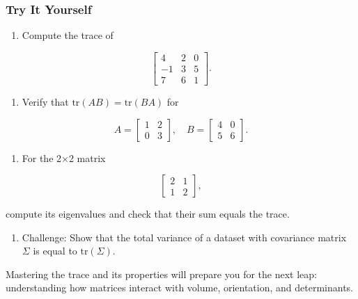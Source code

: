 \documentclass[
  letterpaper,
  DIV=11,
  numbers=noendperiod]{scrreprt}
\providecommand{\tightlist}{%
  \setlength{\itemsep}{0pt}\setlength{\parskip}{0pt}}
\begin{document}
\subsubsection{Try It Yourself}\label{try-it-yourself-17}

\begin{enumerate}
\def\labelenumi{\arabic{enumi}.}
\tightlist
\item
  Compute the trace of
\end{enumerate}

\[
\begin{bmatrix} 
4 & 2 & 0 \\ 
-1 & 3 & 5 \\ 
7 & 6 & 1 
\end{bmatrix}.
\]

\begin{enumerate}
\def\labelenumi{\arabic{enumi}.}
\setcounter{enumi}{1}
\tightlist
\item
  Verify that \(\text{tr}(AB) = \text{tr}(BA)\) for
\end{enumerate}

\[
A = \begin{bmatrix} 1 & 2 \\ 0 & 3 \end{bmatrix}, \quad 
B = \begin{bmatrix} 4 & 0 \\ 5 & 6 \end{bmatrix}.
\]

\begin{enumerate}
\def\labelenumi{\arabic{enumi}.}
\setcounter{enumi}{2}
\tightlist
\item
  For the 2×2 matrix
\end{enumerate}

\[
\begin{bmatrix} 2 & 1 \\ 1 & 2 \end{bmatrix},
\]

compute its eigenvalues and check that their sum equals the trace.

\begin{enumerate}
\def\labelenumi{\arabic{enumi}.}
\setcounter{enumi}{3}
\tightlist
\item
  Challenge: Show that the total variance of a dataset with covariance
  matrix \(\Sigma\) is equal to \(\text{tr}(\Sigma)\).
\end{enumerate}

Mastering the trace and its properties will prepare you for the next
leap: understanding how matrices interact with volume, orientation, and
determinants.
\end{document}
